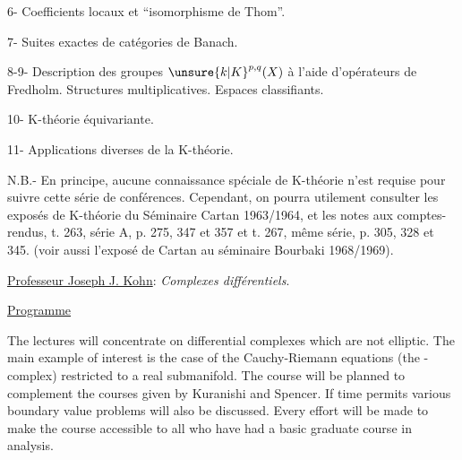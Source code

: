 6- Coefficients locaux et ``isomorphisme de Thom''.

7- Suites exactes de catégories de Banach.

8-9- Description des groupes $\unsure{k|K}^{p,q}(X)$ à l'aide d'opérateurs de Fredholm. Structures multiplicatives. Espaces classifiants.

10- K-théorie équivariante.

11- Applications diverses de la K-théorie.

N.B.- En principe, aucune connaissance spéciale de K-théorie n'est requise pour suivre cette série de conférences. Cependant, on pourra utilement consulter les exposés de K-théorie du Séminaire Cartan 1963/1964, et les notes aux comptes-rendus, t. 263, série A, p. 275, 347 et 357 et t. 267, même série, p. 305, 328 et 345. (voir aussi l'exposé de Cartan au séminaire Bourbaki 1968/1969).

\uline{Professeur Joseph J. Kohn}: \textit{Complexes différentiels}.

\uline{Programme}

The lectures will concentrate on differential complexes which are not elliptic. The main example of interest is the case of the Cauchy-Riemann equations (the \quad- complex) restricted to a real submanifold. The course will be planned to complement the courses given by Kuranishi and Spencer. If time permits various boundary value problems will also be discussed. Every effort will be made to make the course accessible to all who have had a basic graduate course in analysis.

\margin{$\ldots/$}
